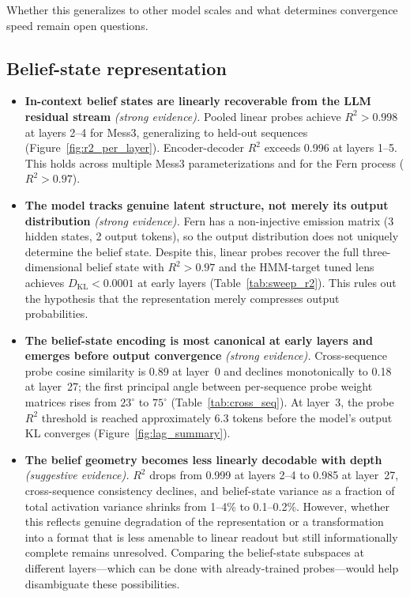 \documentclass[midterm]{sparreport}
\begin{document}
Whether this generalizes to other model scales and what determines convergence speed remain open questions.

\subsection{Belief-state representation}

\begin{itemize}
  \item \textbf{In-context belief states are linearly recoverable from the LLM residual stream} \emph{(strong evidence).}
  Pooled linear probes achieve $R^2 > 0.998$ at layers 2--4 for Mess3, generalizing to held-out sequences (Figure~\ref{fig:r2_per_layer}). Encoder-decoder $R^2$ exceeds 0.996 at layers 1--5. This holds across multiple Mess3 parameterizations and for the Fern process ($R^2 > 0.97$).

  \item \textbf{The model tracks genuine latent structure, not merely its output distribution} \emph{(strong evidence).}
  Fern has a non-injective emission matrix (3 hidden states, 2 output tokens), so the output distribution does not uniquely determine the belief state. Despite this, linear probes recover the full three-dimensional belief state with $R^2 > 0.97$ and the HMM-target tuned lens achieves $D_{\mathrm{KL}} < 0.0001$ at early layers (Table~\ref{tab:sweep_r2}). This rules out the hypothesis that the representation merely compresses output probabilities.

  \item \textbf{The belief-state encoding is most canonical at early layers and emerges before output convergence} \emph{(strong evidence).}
  Cross-sequence probe cosine similarity is 0.89 at layer~0 and declines monotonically to 0.18 at layer~27; the first principal angle between per-sequence probe weight matrices rises from $23^\circ$ to $75^\circ$ (Table~\ref{tab:cross_seq}). At layer~3, the probe $R^2$ threshold is reached approximately 6.3 tokens before the model's output KL converges (Figure~\ref{fig:lag_summary}).

  \item \textbf{The belief geometry becomes less linearly decodable with depth} \emph{(suggestive evidence).}
  $R^2$ drops from 0.999 at layers 2--4 to 0.985 at layer~27, cross-sequence consistency declines, and belief-state variance as a fraction of total activation variance shrinks from 1--4\% to 0.1--0.2\%. However, whether this reflects genuine degradation of the representation or a transformation into a format that is less amenable to linear readout but still informationally complete remains unresolved. Comparing the belief-state subspaces at different layers---which can be done with already-trained probes---would help disambiguate these possibilities.
\end{itemize}
\end{document}
